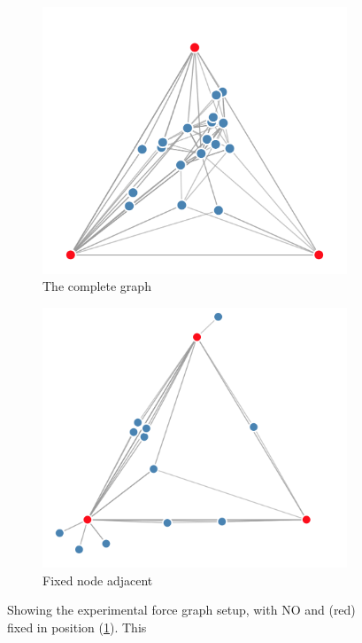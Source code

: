 \begin{figure}[H]
     \centering
      \begin{subfigure}[b]{.38\textwidth}
         \centering
     \includegraphics[width=\textwidth]{figures_c1/frmd.png}\vspace*{+8mm} 
     \caption{The complete graph}
     \label{fig:frmd_setup}
     \end{subfigure}
    \begin{subfigure}[b]{.45\textwidth}
         \centering
     \includegraphics[width=\textwidth]{figures_c1/frmd2.png}
     \caption{Fixed node adjacent}
     \label{fig:frmd_nox}
     \end{subfigure}
        \caption{Showing the experimental force graph setup, with NO  and   (red) fixed in position (\ref{fig:frmd_setup}). This     }
      \label{fig:frmdstart}
\end{figure}
 
